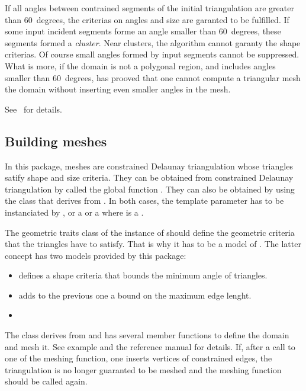 If all angles between contrained segments of the initial triangulation
are greater than $60$~degrees, the criterias on angles and size are
garanted to be fulfilled. If some input incident segments forme an
angle smaller than $60$~degrees, these segments formed a
\textit{cluster}. Near clusters, the algorithm cannot garanty the
shape criterias. Of course small angles formed by input segments
cannot be suppressed. What is more, if the domain is not a polygonal
region, and includes angles smaller than $60$~degrees,
\cite{s-mgdsa-00} has prooved that one cannot compute a triangular
mesh the domain without inserting even smaller angles in the mesh.

See~\cite{s-mgdsa-00} for details.


\subsection{Building meshes}
\label{sec:Mesh_2_building_meshes}

In this package, meshes are constrained Delaunay triangulation whose
triangles satify shape and size criteria. They can be obtained from
constrained Delaunay triangulation by called the global function
. They can also be obtained by using the class
 that derives from . In both cases,
the template parameter  has to be instanciated by
, or a
 or a
 where  is a
.

The geometric traits class of the instance of  should define
the geometric criteria that the triangles have to satisfy. That is why
it has to be a model of . The latter concept 
has two models provided by this package:
\begin{itemize}
\item {} defines a shape criteria that
  bounds the minimum angle of triangles.
\item {} adds to the previous one a
  bound on the maximum edge lenght.
\item {}
\end{itemize}

The class  derives from  and has
several member functions to define the domain and mesh it. See example 
and the reference manual for details. If, after a call to one of the
meshing function, one inserts vertices of constrained edges, the
triangulation is no longer guaranted to be meshed and the meshing
function should be called again.

